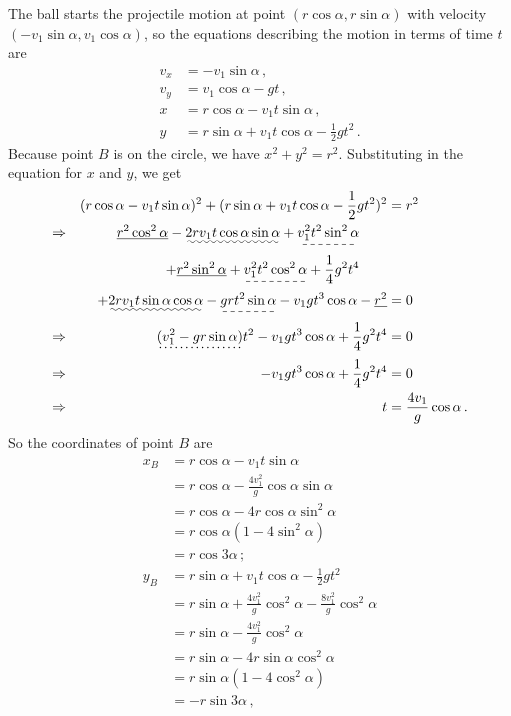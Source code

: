 \documentclass[]{article}
\begin{document}
The ball starts the projectile motion at point $(r\cos\alpha, r\sin\alpha)$ with velocity $(-v_1\sin\alpha, v_1\cos\alpha)$, so the equations describing the motion in terms of time $t$ are
\begin{align*}
v_x &= -v_1\sin\alpha\,,\\
v_y &= v_1\cos\alpha - gt\,,\\
x &= r\cos\alpha-v_1t\sin\alpha\,,\\
y &= r\sin\alpha + v_1t\cos\alpha - \frac{1}{2}gt^2\,.
\end{align*}
Because point $B$ is on the circle, we have $x^2+y^2=r^2$. Substituting in the equation for $x$ and $y$, we get
\begin{align*}
&&(r\cos\alpha-v_1t\sin\alpha)^2 + (r\sin\alpha + v_1t\cos\alpha - \frac{1}{2}gt^2)^2 &= r^2\\
\Rightarrow && \uline{r^2\cos^2\alpha} -\uwave{2rv_1t\cos\alpha\sin\alpha} + \dashuline{v_1^2t^2\sin^2\alpha}\qquad& \\
&&+ \uline{r^2\sin^2\alpha} + \dashuline{v_1^2t^2\cos^2\alpha} + \frac{1}{4} g^2t^4\qquad& \\ &&+\uwave{2rv_1t\sin\alpha\cos\alpha} -\dashuline{grt^2\sin\alpha}-v_1gt^3\cos\alpha - \uline{r^2} &= 0\\
\Rightarrow && \dotuline{(v_1^2 - gr\sin\alpha)}t^2 -v_1gt^3\cos\alpha +  \frac{1}{4} g^2t^4 &= 0 \\
\Rightarrow && -v_1gt^3\cos\alpha +  \frac{1}{4} g^2t^4 &= 0 \\
\Rightarrow && t &= \frac{4v_1}{g}\cos\alpha\,.
\end{align*}
So the coordinates of point $B$ are
\begin{align*}
x_B &= r\cos\alpha-v_1t\sin\alpha \\
&=r\cos\alpha-\frac{4v_1^2}{g}\cos\alpha\sin\alpha\\
&=r\cos\alpha-4r\cos\alpha\sin^2\alpha\\
&=r\cos\alpha(1-4\sin^2\alpha)\\
&=r\cos3\alpha\,;\\
y_B &= r\sin\alpha + v_1t\cos\alpha - \frac{1}{2}gt^2\\
&=r\sin\alpha + \frac{4v_1^2}{g}\cos^2\alpha -\frac{8v_1^2}{g}\cos^2\alpha\\
&=r\sin\alpha - \frac{4v_1^2}{g}\cos^2\alpha\\
&=r\sin\alpha - 4r\sin\alpha\cos^2\alpha\\
&=r\sin\alpha(1-4\cos^2\alpha)\\
&=-r\sin3\alpha\,,
\end{align*}
\end{document}
